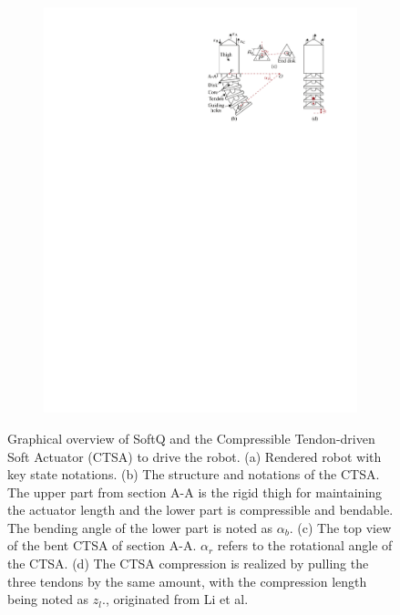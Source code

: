 \begin{figure}[htb]
\begin{subfigure}[b]{0.59\textwidth}
    \includegraphics[width=\linewidth]{img/chap3/legs.pdf}
    \end{subfigure}
    \caption{Graphical overview of SoftQ and the Compressible Tendon-driven Soft Actuator (CTSA) to drive the robot. (a) Rendered robot with key state notations. (b) The structure and notations of the CTSA. The upper part from section A-A is the rigid thigh for maintaining the actuator length and the lower part is compressible and bendable. The bending angle of the lower part is noted as $\alpha_b$. (c) The top view of the bent CTSA of section A-A. $\alpha_r$ refers to the rotational angle of the CTSA. (d) The CTSA compression is realized by pulling the three tendons by the same amount, with the compression length being noted as $z_l$., originated from Li et al.\cite{jiSynthesizingOptimalGait2022, jiOmnidirectionalWalkingQuadruped2022}}
    \label{fig:robot}
\end{figure}